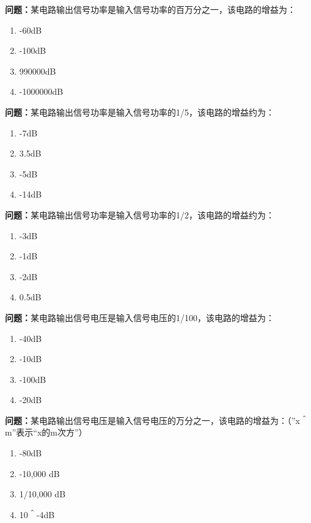 \bigskip


\noindent\textbf{问题：}某电路输出信号功率是输入信号功率的百万分之一，该电路的增益为：
\begin{enumerate}[label=\Alph*), leftmargin=3em]
\item -60dB
\item -100dB
\item 990000dB
\item -1000000dB
\end{enumerate}

\bigskip


\noindent\textbf{问题：}某电路输出信号功率是输入信号功率的1/5，该电路的增益约为：
\begin{enumerate}[label=\Alph*), leftmargin=3em]
\item -7dB
\item 3.5dB
\item -5dB
\item -14dB
\end{enumerate}

\bigskip


\noindent\textbf{问题：}某电路输出信号功率是输入信号功率的1/2，该电路的增益约为：
\begin{enumerate}[label=\Alph*), leftmargin=3em]
\item -3dB
\item -1dB
\item -2dB
\item 0.5dB
\end{enumerate}

\bigskip


\noindent\textbf{问题：}某电路输出信号电压是输入信号电压的1/100，该电路的增益为：
\begin{enumerate}[label=\Alph*), leftmargin=3em]
\item -40dB
\item -10dB
\item -100dB
\item -20dB
\end{enumerate}

\bigskip


\noindent\textbf{问题：}某电路输出信号电压是输入信号电压的万分之一，该电路的增益为：（”x＾m”表示“x的m次方”）
\begin{enumerate}[label=\Alph*), leftmargin=3em]
\item -80dB
\item -10,000 dB
\item 1/10,000 dB
\item 10＾-4dB
\end{enumerate}

